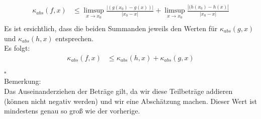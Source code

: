 \documentclass{llncs}
\begin{document}
\begin{align*}
\kappa_{abs}(f,x)&\le \limsup_{x \rightarrow x_0} \frac{|(g(x_0)-g(x))|}{|x_0-x|}+\limsup_{x \rightarrow x_0} \frac{|(h(x_0)-h(x)|}{|x_0-x|} \\
\end{align*}
Es ist ersichtlich, dass die beiden Summanden jeweils den Werten für $\kappa_{abs}(g,x)$ und $\kappa_{abs}(h,x)$ entsprechen.\\
Es folgt:\\
\begin{align*}
\kappa_{abs}(f,x)&\le \kappa_{abs}(h,x)+\kappa_{abs}(g,x) \\
\end{align*} \hfill $\square$\\
Bemerkung:\\ Das Auseinanderziehen der Beträge gilt, da wir diese Teilbeträge addieren (können nicht negativ werden) und wir eine Abschätzung machen. Dieser Wert ist mindestens genau so groß wie der vorherige.
\end{document}
